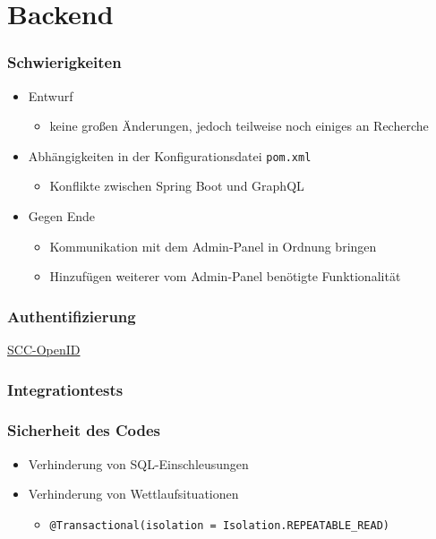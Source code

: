 \section{Backend}

\begin{frame}\frametitle{Schwierigkeiten}
\begin{itemize}
	\item Entwurf
	\begin{itemize}
		\item keine großen Änderungen, jedoch teilweise noch einiges an Recherche
	\end{itemize}
	\item Abhängigkeiten in der Konfigurationsdatei \texttt{pom.xml}
	\begin{itemize}
		\item Konflikte zwischen Spring Boot und GraphQL
	\end{itemize}
	\item Gegen Ende
	\begin{itemize}
		\item Kommunikation mit dem Admin-Panel in Ordnung bringen
		\item Hinzufügen weiterer vom Admin-Panel benötigte Funktionalität
	\end{itemize}
\end{itemize}
\end{frame}


    \begin{frame}\frametitle{Authentifizierung}
        \href{https://www.scc.kit.edu/dienste/openid-connect.php}{SCC-OpenID}
    \end{frame}

    \begin{frame}\frametitle{Integrationtests}
    \end{frame}

    \begin{frame}
    \end{frame}

    \begin{frame}

    \end{frame}

\begin{frame}\frametitle{Sicherheit des Codes}
\begin{itemize}
	\item Verhinderung von SQL-Einschleusungen
	\item Verhinderung von Wettlaufsituationen
	\begin{itemize}
		\item \texttt{@Transactional(isolation = Isolation.REPEATABLE\_READ)}
	\end{itemize}
\end{itemize}
\end{frame}
